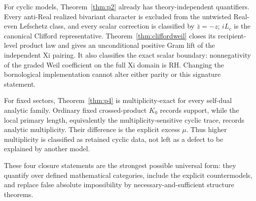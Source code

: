 \documentclass[11pt,reqno]{amsart}
\begin{document}
For cyclic models, Theorem~\ref{thm:p2} already has theory-independent quantifiers.  Every
anti-Real realized bivariant character is excluded from the untwisted Real-even Lefschetz class,
and every scalar correction is classified by $\bar z=-z$; $iL_c$ is the canonical Clifford
representative.  Theorem~\ref{thm:cliffordweil} closes its recipient-level product law and gives an
unconditional positive Gram lift of the independent Xi pairing.  It also classifies the exact scalar boundary:
nonnegativity of the graded Weil coefficient on the full Xi domain is RH.  Changing the
bornological implementation cannot alter either parity or this signature statement.

For fixed sectors, Theorem~\ref{thm:p4} is multiplicity-exact for every self-dual analytic family.
Ordinary fixed crossed-product $K_0$ records support, while the local primary length, equivalently
the multiplicity-sensitive cyclic trace, records analytic multiplicity.  Their difference is the
explicit excess $\mu$.  Thus higher multiplicity is classified as retained cyclic data, not left
as a defect to be explained by another model.

These four closure statements are the strongest possible universal form: they quantify over
defined mathematical categories, include the explicit countermodels, and replace false absolute
impossibility by necessary-and-sufficient structure theorems.
\end{document}
